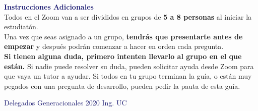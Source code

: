 \begin{coverpages}
\begin{flushleft}
        \vfill
        \vfill

        \textcolor{MidnightBlue}{\textbf{\large Instrucciones Adicionales}}\\

        Todos en el Zoom van a ser divididos en grupos de \textbf{5 a 8 personas} al iniciar la estudiatón.\\ Una vez que seas asignado a un grupo, \textbf{tendrás que presentarte antes de empezar} y después podrán comenzar a hacer en orden cada pregunta.\\[\baselineskip]

        \textbf{Si tienen alguna duda, primero intenten llevarlo al grupo en el que están.} Si nadie puede resolver su duda, pueden solicitar ayuda desde Zoom para que vaya un tutor a ayudar. Si todos en tu grupo terminan la guía, o están muy pegados con una pregunta de desarrollo, pueden pedir la pauta de esta guía.

        \vspace{3mm} \textcolor{MidnightBlue}{\small Delegados Generacionales 2020 Ing. UC}
    \end{flushleft}
\end{coverpages}
\newpage

{\printanswers}{}